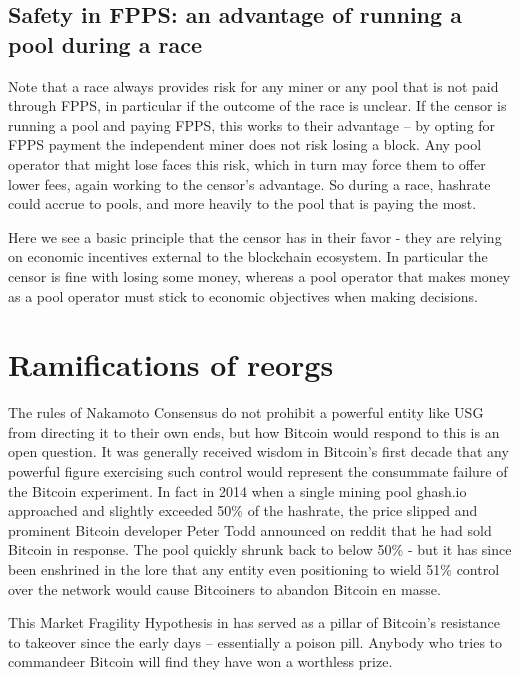 \documentclass{article}%
\begin{document}
\subsection{Safety in FPPS: an \label{fppssafe}advantage of running a
pool during a race}

Note that a race always provides risk for any miner or any pool that is not
paid through FPPS, in particular if the outcome of the race is unclear.  If
the censor is running a pool and paying FPPS, this works to their advantage --
by opting for FPPS payment the independent miner does not risk losing a
block.  Any pool operator that might lose faces this risk, which in turn may
force them to offer lower fees, again working to the censor's advantage. So
during a race, hashrate could accrue to pools, and more heavily to the pool
that is paying the most.

Here we see a basic principle that the censor has in their favor - they are
relying on economic incentives external to the blockchain ecosystem. In particular the censor is fine with losing some money, whereas a pool operator that makes money as a
pool operator must stick to economic objectives when making decisions.

\section{Ramifications\label{reorgs} of reorgs}

The rules of Nakamoto Consensus do not prohibit a powerful entity like USG from directing it to their own ends, but how Bitcoin would respond to this is an open question.
 It was generally received wisdom in Bitcoin's first decade that any
powerful figure exercising such control would represent the consummate
failure of the Bitcoin experiment.  In fact in 2014 when a single mining pool
ghash.io approached and slightly exceeded 50\% of the hashrate, the price
slipped and prominent Bitcoin developer Peter Todd announced on reddit that he
had sold Bitcoin in response.  The pool quickly shrunk back to below 50\% -  but it has since been
enshrined in the lore that any entity even positioning to wield 51\% control
over the network would cause Bitcoiners to abandon Bitcoin en masse.

This Market Fragility Hypothesis in \cite[Chapter
10]{Warren23} has served as a pillar of Bitcoin's resistance to takeover
since the early days -- essentially a poison pill.  Anybody who tries to commandeer
Bitcoin will find they have won a worthless prize.
\end{document}
